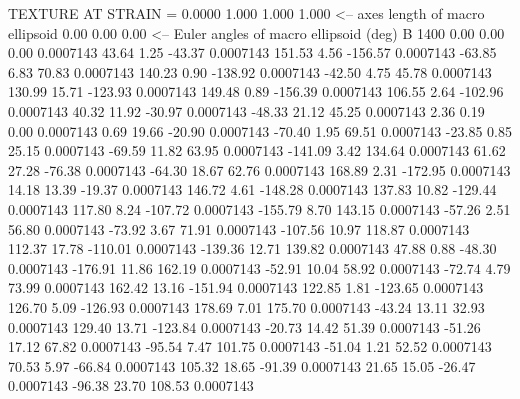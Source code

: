 TEXTURE AT STRAIN =    0.0000
   1.000   1.000   1.000  <-- axes length of macro ellipsoid
    0.00    0.00    0.00  <-- Euler angles of macro ellipsoid (deg)
B      1400
        0.00        0.00        0.00     0.0007143
       43.64        1.25      -43.37     0.0007143
      151.53        4.56     -156.57     0.0007143
      -63.85        6.83       70.83     0.0007143
      140.23        0.90     -138.92     0.0007143
      -42.50        4.75       45.78     0.0007143
      130.99       15.71     -123.93     0.0007143
      149.48        0.89     -156.39     0.0007143
      106.55        2.64     -102.96     0.0007143
       40.32       11.92      -30.97     0.0007143
      -48.33       21.12       45.25     0.0007143
        2.36        0.19        0.00     0.0007143
        0.69       19.66      -20.90     0.0007143
      -70.40        1.95       69.51     0.0007143
      -23.85        0.85       25.15     0.0007143
      -69.59       11.82       63.95     0.0007143
     -141.09        3.42      134.64     0.0007143
       61.62       27.28      -76.38     0.0007143
      -64.30       18.67       62.76     0.0007143
      168.89        2.31     -172.95     0.0007143
       14.18       13.39      -19.37     0.0007143
      146.72        4.61     -148.28     0.0007143
      137.83       10.82     -129.44     0.0007143
      117.80        8.24     -107.72     0.0007143
     -155.79        8.70      143.15     0.0007143
      -57.26        2.51       56.80     0.0007143
      -73.92        3.67       71.91     0.0007143
     -107.56       10.97      118.87     0.0007143
      112.37       17.78     -110.01     0.0007143
     -139.36       12.71      139.82     0.0007143
       47.88        0.88      -48.30     0.0007143
     -176.91       11.86      162.19     0.0007143
      -52.91       10.04       58.92     0.0007143
      -72.74        4.79       73.99     0.0007143
      162.42       13.16     -151.94     0.0007143
      122.85        1.81     -123.65     0.0007143
      126.70        5.09     -126.93     0.0007143
      178.69        7.01      175.70     0.0007143
      -43.24       13.11       32.93     0.0007143
      129.40       13.71     -123.84     0.0007143
      -20.73       14.42       51.39     0.0007143
      -51.26       17.12       67.82     0.0007143
      -95.54        7.47      101.75     0.0007143
      -51.04        1.21       52.52     0.0007143
       70.53        5.97      -66.84     0.0007143
      105.32       18.65      -91.39     0.0007143
       21.65       15.05      -26.47     0.0007143
      -96.38       23.70      108.53     0.0007143
